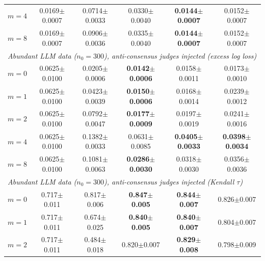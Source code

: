 \begin{table}[!t]
{\begin{tabular}{lccccc}
\quad $m=4$ & 0.0169{\scriptsize$\pm$0.0007} & 0.0714{\scriptsize$\pm$0.0033} & 0.0330{\scriptsize$\pm$0.0040} & \textbf{0.0144{\scriptsize$\pm$0.0007}} & 0.0152{\scriptsize$\pm$0.0007} \\
\quad $m=8$ & 0.0169{\scriptsize$\pm$0.0007} & 0.0906{\scriptsize$\pm$0.0036} & 0.0335{\scriptsize$\pm$0.0040} & \textbf{0.0144{\scriptsize$\pm$0.0007}} & 0.0152{\scriptsize$\pm$0.0007} \\
\midrule
\multicolumn{6}{l}{\emph{Abundant LLM data ($n_0=300$), anti-consensus judges injected (excess log loss)}} \\
\quad $m=0$ & 0.0625{\scriptsize$\pm$0.0100} & 0.0205{\scriptsize$\pm$0.0006} & \textbf{0.0142{\scriptsize$\pm$0.0006}} & 0.0158{\scriptsize$\pm$0.0011} & 0.0173{\scriptsize$\pm$0.0010} \\
\quad $m=1$ & 0.0625{\scriptsize$\pm$0.0100} & 0.0423{\scriptsize$\pm$0.0039} & \textbf{0.0150{\scriptsize$\pm$0.0006}} & 0.0168{\scriptsize$\pm$0.0014} & 0.0239{\scriptsize$\pm$0.0012} \\
\quad $m=2$ & 0.0625{\scriptsize$\pm$0.0100} & 0.0792{\scriptsize$\pm$0.0047} & \textbf{0.0177{\scriptsize$\pm$0.0009}} & 0.0197{\scriptsize$\pm$0.0019} & 0.0241{\scriptsize$\pm$0.0016} \\
\quad $m=4$ & 0.0625{\scriptsize$\pm$0.0100} & 0.1382{\scriptsize$\pm$0.0033} & 0.0631{\scriptsize$\pm$0.0085} & \textbf{0.0405{\scriptsize$\pm$0.0033}} & \textbf{0.0398{\scriptsize$\pm$0.0034}} \\
\quad $m=8$ & 0.0625{\scriptsize$\pm$0.0100} & 0.1081{\scriptsize$\pm$0.0063} & \textbf{0.0286{\scriptsize$\pm$0.0030}} & 0.0318{\scriptsize$\pm$0.0030} & 0.0356{\scriptsize$\pm$0.0036} \\
\midrule
\multicolumn{6}{l}{\emph{Abundant LLM data ($n_0=300$), anti-consensus judges injected (Kendall $\tau$)}} \\
\quad $m=0$ & 0.717{\scriptsize$\pm$0.011} & 0.817{\scriptsize$\pm$0.006} & \textbf{0.847{\scriptsize$\pm$0.005}} & \textbf{0.844{\scriptsize$\pm$0.007}} & 0.826{\scriptsize$\pm$0.007} \\
\quad $m=1$ & 0.717{\scriptsize$\pm$0.011} & 0.674{\scriptsize$\pm$0.025} & \textbf{0.840{\scriptsize$\pm$0.005}} & \textbf{0.840{\scriptsize$\pm$0.007}} & 0.804{\scriptsize$\pm$0.007} \\
\quad $m=2$ & 0.717{\scriptsize$\pm$0.011} & 0.484{\scriptsize$\pm$0.018} & 0.820{\scriptsize$\pm$0.007} & \textbf{0.829{\scriptsize$\pm$0.008}} & 0.798{\scriptsize$\pm$0.009} \\

\end{tabular}}
\end{table}
